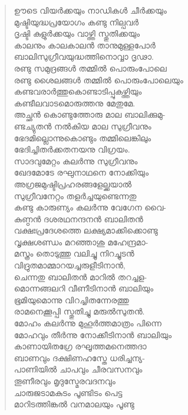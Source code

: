 \begin{verse}
ഊടെ വിയര്‍ക്കയും നാഡികള്‍ ചീര്‍ക്കയും\\
മുഷ്ടിയുദ്ധപ്രയോഗം കണ്ടു നില്പവര്‍\\
ദൃഷ്ടി കുളുര്‍ക്കയും വാഴ്ത്തി സ്തുതിക്കയും\\
കാലനും കാലകാലന്‍ താനുമുള്ളപോര്‍\\
ബാലിസുഗ്രീവയുദ്ധത്തിനൊവ്വാ ദൃഢാ.\\
രണ്ടു സമുദ്രങ്ങള്‍ തമ്മില്‍ പൊരുംപോലെ\\
രണ്ടു ശൈലങ്ങള്‍ തമ്മില്‍ പൊരുംപോലെയും\\
കണ്ടവരാര്‍ത്തുകൊണ്ടാടിപ്പുകഴ്ത്തിയും\\
കണ്ടീലവാടമൊരുത്തനു മേതുമേ.\\
അച്ഛന്‍ കൊണ്ടുത്തോരു മാല ബാലിക്കുമു-\\
ണ്ടച്യുതന്‍ നല്‍കിയ മാല സുഗ്രീവനും\\
ഭേദമില്ലൊന്നുകൊണ്ടും തമ്മിലെങ്കിലും\\
ഭേദിച്ചിതര്‍ക്കതനയനു വിഗ്രയം.\\
സാദവുമേറ്റം കലര്‍ന്നു സുഗ്രീവനും\\
ഖേദമോടേ രഘുനാഥനെ നോക്കിയും\\
അഗ്രജമുഷ്ടിപ്രഹരങ്ങളേല്ക്കയാല്‍\\
സുഗ്രീവനേറ്റം തളര്‍ച്ചയുണ്ടെന്നതു\\
കണ്ടു കാരുണ്യം കലര്‍ന്നു വേഗേന വൈ-\\
കുണ്ഠന്‍ ദശരഥനന്ദനന്‍ ബാലിതന്‍\\
വക്ഷഃപ്രദേശത്തെ ലക്ഷ്യമാക്കിക്കൊണ്ടു\\
വൃക്ഷശണ്ഡം മറഞ്ഞാശു മഹേന്ദ്രമാ-\\
മസ്ത്രം തൊടുത്തു വലിച്ചു നിറച്ചുടന്‍\\
വിദ്രുതമാമ്മാറയച്ചരുളീടിനാന്‍,\\
ചെന്നതു ബാലിതന്‍ മാറില്‍ തറച്ചള-\\
മൊന്നങ്ങലറി വീണീടിനാന്‍ ബാലിയും\\
ഭൂമിയുമൊന്നു വിറച്ചിതന്നേരത്തു\\
രാമനെക്കൂപ്പി സ്തുതിച്ചു മരുല്‍സുതന്‍.\\
മോഹം കലര്‍ന്നു മുഹൂര്‍ത്തമാത്രം പിന്നെ\\
മോഹവും തീര്‍ന്നു നോക്കീടിനാന്‍ ബാലിയും\\
കാണായിതഗ്രേ രഘൂത്തമനെത്തദാ\\
ബാണവും ദക്ഷിണഹസ്തേ ധരിച്ചന്യ-\\
പാണിയില്‍ ചാപവും ചീരവസനവും\\
തൂണീരവും മൃദുസ്മേരവദനവും\\
ചാരുജടാമകുടം പൂണ്ടിടം പെട്ട\\
മാറിടത്തിങ്കല്‍ വനമാലയും പൂണ്ടു\\

\end{verse}
